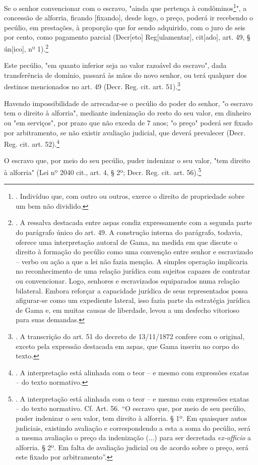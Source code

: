 Se o senhor convencionar com o escravo, "ainda que pertença à
condôminos\footnote{. Indivíduo que, com outro ou outros, exerce o
  direito de propriedade sobre um bem não dividido.}", a concessão de
alforria, ficando {[}fixando{]}, desde logo, o preço, poderá ir
recebendo o pecúlio, em prestações, à proporção que for sendo adquirido,
com o juro de seis por cento, como pagamento parcial (Decr{[}eto{]}
Reg{[}ulamentar{]}, cit{[}ado{]}, art. 49, § ún{[}ico{]}, nº
1).\footnote{. A ressalva destacada entre aspas condiz expressamente com
  a segunda parte do parágrafo único do art. 49. A construção interna do
  parágrafo, todavia, oferece uma interpretação autoral de Gama, na
  medida em que discute o direito à formação do pecúlio como uma
  convenção entre senhor e escravizado -- verbo ou ação a que a lei não
  fazia menção. A simples operação implicaria no reconhecimento de uma
  relação jurídica com sujeitos capazes de contratar ou convencionar.
  Logo, senhores e escravizados equiparados numa relação bilateral.
  Embora reforçar a capacidade jurídica de seus representados possa
  afigurar-se como um expediente lateral, isso fazia parte da estratégia
  jurídica de Gama e, em muitas causas de liberdade, levou a um desfecho
  vitorioso para suas demandas.}

Este pecúlio, "em quanto inferior seja ao valor razoável do escravo",
dada transferência de domínio, passará às mãos do novo senhor, ou terá
qualquer dos destinos mencionados no art. 49 (Decr. Reg. cit. art.
51).\footnote{. A transcrição do art. 51 do decreto de 13/11/1872
  confere com o original, exceto pela expressão destacada em aspas, que
  Gama inseriu no corpo do texto.}

Havendo impossibilidade de arrecadar-se o pecúlio do poder do senhor, "o
escravo tem o direito à alforria", mediante indenização do resto do seu
valor, em dinheiro ou "em serviços", por prazo que não exceda de 7 anos;
"o preço" poderá ser fixado por arbitramento, se não existir avaliação
judicial, que deverá prevalecer (Decr. Reg. cit. art. 52).\footnote{. A
  interpretação está alinhada com o teor -- e mesmo com expressões
  exatas -- do texto normativo.}

O escravo que, por meio do seu pecúlio, puder indenizar o seu valor,
"tem direito à alforria" (Lei nº 2040 cit., art. 4, § 2º; Decr. Reg.
cit. art. 56).\footnote{. A interpretação está alinhada com o teor -- e
  mesmo com expressões exatas -- do texto normativo. Cf. Art. 56. ``O
  escravo que, por meio de seu pecúlio, puder indenizar o seu valor, tem
  direito à alforria. § 1º. Em quaisquer autos judiciais, existindo
  avaliação e correspondendo a esta a soma do pecúlio, será a mesma
  avaliação o preço da indenização (...) para ser decretada
  \emph{ex-officio} a alforria. § 2º. Em falta de avaliação judicial ou
  de acordo sobre o preço, será este fixado por arbitramento''.}

